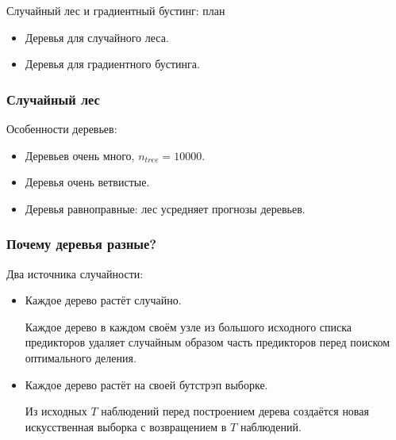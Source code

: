 
\begin{frame} %

  
  \end{frame}
  
  
  
  \begin{frame}{Случайный лес и градиентный бустинг: план}
    \begin{itemize}[<+->]
      \item Деревья для случайного леса.
      \item Деревья для градиентного бустинга.
    \end{itemize}
  
  \end{frame}
  

  \begin{frame}
    \frametitle{Случайный лес}

    Особенности деревьев:
    \begin{itemize}[<+->]
      \item Деревьев очень \alert{много}, $n_{tree} = 10000$.
      \item Деревья очень \alert{ветвистые}.
      \item Деревья равноправные: лес \alert{усредняет} прогнозы деревьев.  
    \end{itemize}
  \end{frame}

  \begin{frame}
    \frametitle{Почему деревья разные?}

      Два источника \alert{случайности}:
      \begin{itemize}[<+->]
        \item Каждое дерево растёт случайно. 
        
        Каждое дерево в \alert{каждом своём узле} из большого исходного списка предикторов 
        \alert{удаляет} случайным образом часть предикторов перед поиском оптимального деления. 

        \item Каждое дерево растёт на своей бутстрэп выборке. 
        
        Из исходных $T$ наблюдений перед построением дерева создаётся новая \alert{искусственная выборка с возвращением} 
        в $T$ наблюдений. 
      \end{itemize}
  \end{frame}


